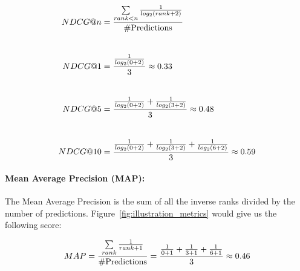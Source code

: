 \begin{equation}
\setlength{\jot}{25pt}
    \begin{aligned}
        NDCG@n&=\frac{ \sum\limits_{rank<n}
      \frac{1}{log_2(rank + 2)}}
      {\text{\#Predictions}} \\
        NDCG@1&=\frac{\frac{1}{log_2(0 + 2)}}{3}\approx 0.33 \\
        NDCG@5&=\frac{\frac{1}{log_2(0 + 2)}+\frac{1}{log_2(3+2)}}{3}\approx 0.48 \\
        NDCG@10&=\frac{\frac{1}{log_2(0 + 2)}+\frac{1}{log_2(3+2)}+\frac{1}{log_2(6+2)}}{3}\approx 0.59
    \end{aligned}
    \label{equation:NDCG}
\end{equation}


\paragraph{Mean Average Precision (MAP):}
The Mean Average Precision is the sum of all the inverse ranks divided by the number of predictions. Figure~\ref{fig:illustration_metrics} would give us the following score:

\begin{equation}
\setlength{\jot}{25pt}
    \begin{aligned}
        MAP=\frac{ \sum\limits_{rank}
      \frac{1}{rank + 1}}
      {\text{\#Predictions}} = \frac{\frac{1}{0+1} +\frac{1}{3+1} + \frac{1}{6+1}}{3} \approx 0.46
    \end{aligned}
    \label{equation:MAP}
\end{equation}